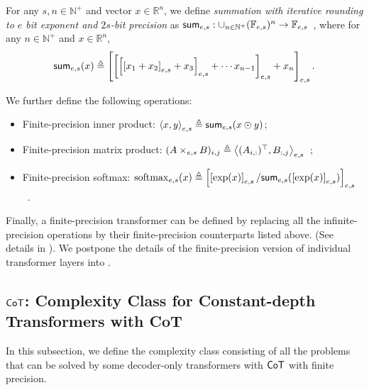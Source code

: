 \begin{definition} For any $s,n\in\mathbb{N}^+$ and vector $x\in\mathbb{R}^n$, we define \emph{summation with iterative rounding to $e$ bit exponent and $2s$-bit precision} as $\mathsf{sum}_{e,s}:\cup_{n\in\mathbb{N}^+}(\mathbb{F}_{e,s})^n\to \mathbb{F}_{e,s}$\ , where for any $n\in\mathbb{N}^+$ and $x\in\mathbb{R}^n$, $$\mathsf{sum}_{e,s}(x)\triangleq \left[\left[\left[\left[x_1+x_2\right]_{e,s}+x_3\right]_{e,s}+\cdots x_{n-1}\right]_{e,s}+x_n\right]_{e,s}.$$

We further define the following operations:
\begin{itemize}
	\item Finite-precision inner product: $\left\langle x,y \right\rangle_{e,s}\triangleq \mathsf{sum}_{e,s}(x\odot y)$;
	\item Finite-precision matrix product: $(A\times_{e,s} B)_{i,j} \triangleq \left\langle (A_{i,:})^\top,B_{:,j} \right\rangle_{e,s}$\ ;
	\item Finite-precision softmax: $\mathrm{softmax}_{e,s}(x)\triangleq \left[\left[\exp(x)\right]_{e,s}/\mathsf{sum}_{e,s}(\left[\exp(x)\right]_{e,s})\right]_{e,s}$\ .
\end{itemize}
\end{definition}


Finally,  a finite-precision transformer can be defined by replacing all the infinite-precision operations by their finite-precision counterparts listed above. (See details in ). We postpone the details of the finite-precision version of individual transformer layers into . 



 
\subsection{$\Cot$: Complexity Class for Constant-depth Transformers with CoT}


In this subsection, we define the complexity class consisting of all the problems that can be solved by some decoder-only transformers with $\Cot$ with finite precision.  

